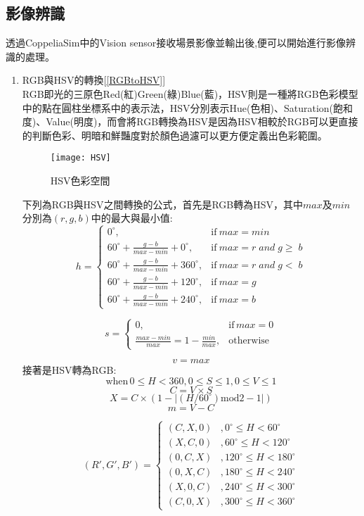 \subsection{影像辨識}
 透過CoppeliaSim中的Vision sensor接收場景影像並輸出後,便可以開始進行影像辨識的處理。\\
\begin{enumerate}
\item RGB與HSV的轉換[\ref{RGBtoHSV}]\\
RGB即光的三原色Red(紅)Green(綠)Blue(藍)，HSV則是一種將RGB色彩模型中的點在圓柱坐標系中的表示法，HSV分別表示Hue(色相)、Saturation(飽和度)、Value(明度)，而會將RGB轉換為HSV是因為HSV相較於RGB可以更直接的判斷色彩、明暗和鮮豔度對於顏色過濾可以更方便定義出色彩範圍。\\
\begin{figure}[hbt!]
\center
\texttt{[image: HSV]}
\caption{\Large HSV色彩空間}
\end{figure}
\newpage
下列為RGB與HSV之間轉換的公式，首先是RGB轉為HSV，其中$max$及$min$分別為$(r,g,b)$中的最大與最小值:
$$h=\left\{\begin{matrix}
0^{\circ}, & \textrm{if}\ max=min\\ 
60^{\circ}+\frac{g-b}{max-min}+0^{\circ},& \textrm{if}\ max=r\;and\;g\geq \;b\\ 
60^{\circ}+\frac{g-b}{max-min}+360^{\circ}, & \textrm{if}\ max=r\;and\;g<  \;b\\ 
60^{\circ}+\frac{g-b}{max-min}+120^{\circ}, & \textrm{if}\ max=g\\ 
60^{\circ}+\frac{g-b}{max-min}+240^{\circ}, & \textrm{if}\ max=b
\end{matrix}\right.$$

$$s=\left\{\begin{matrix}
0, & \textrm{if}\,max=0\\ 
\frac{max-min}{max}=1-\frac{min}{max}, & \textrm{otherwise}
\end{matrix}\right.$$

$$v=max$$
接著是HSV轉為RGB:
$$\textrm{when}\,0\leq H< 360,0\leq S\leq 1,0\leq V\leq 1$$
$$C=V\times S$$
$$X=C\times (1-\left | (H/60^{\circ})\textrm{mod}2-1 \right |)$$
$$m=V-C$$

$$({R}',{G}',{B}')=\left\{\begin{matrix}
(C,X,0)& ,0^{\circ}\leq H< 60^{\circ}\\ 
 (X,C,0)& ,60^{\circ}\leq H< 120^{\circ}\\ 
 (0,C,X)& ,120^{\circ}\leq H< 180^{\circ}\\ 
 (0,X,C)& ,180^{\circ}\leq H< 240^{\circ}\\ 
 (X,0,C)& ,240^{\circ}\leq H< 300^{\circ}\\ 
 (C,0,X)& ,300^{\circ}\leq H< 360^{\circ}
\end{matrix}\right.$$



\end{enumerate}
